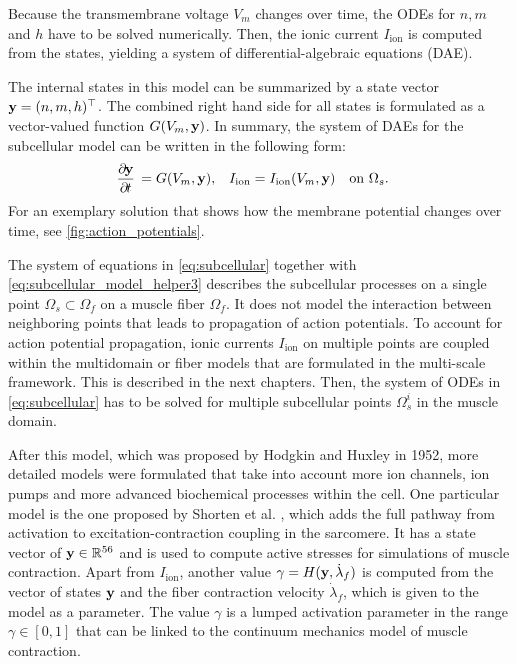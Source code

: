 Because the transmembrane voltage $V_m$ changes over time, the ODEs for $n, m$ and $h$ have to be solved numerically. Then, the ionic current $I_\text{ion}$ is computed from the states, yielding a system of differential-algebraic equations (DAE).

The internal states in this model can be summarized by a state vector $\textbf{y} = (n,m,h)^\top$. 
The combined right hand side for all states is formulated as a vector-valued function $G(V_m,\textbf{y})$.
In summary, the system of DAEs for the subcellular model can be written in the following form:
\begin{align}
  \dfrac{\partial\bfy}{\partial t} &= G(V_m,\bfy),& I_\text{ion}&=I_\text{ion}(V_m,\bfy) \quad \text{on }\Omega_s\label{eq:subcellular}.
\end{align}
For an exemplary solution that shows how the membrane potential changes over time, see \cref{fig:action_potentials}. 

The system of equations in \cref{eq:subcellular} together with \cref{eq:subcellular_model_helper3} describes the subcellular processes on a single point $\Omega_s \subset \Omega_f$ on a muscle fiber $\Omega_f$. 
It does not model the interaction between neighboring points that leads to propagation of action potentials.
To account for action potential propagation, ionic currents $I_\text{ion}$ on multiple points are coupled within the multidomain or fiber models that are formulated in the multi-scale framework. This is described in the next chapters.
Then, the system of ODEs in \cref{eq:subcellular} has to be solved for multiple subcellular points $\Omega_s^i$ in the muscle domain.

After this model, which was proposed by Hodgkin and Huxley in 1952, more detailed models were formulated that take into account more ion channels, ion pumps and more advanced biochemical processes within the cell. One particular model is the one proposed by Shorten et al. \cite{Shorten2007}, which adds the full pathway from activation to excitation-contraction coupling in the sarcomere. It has a state vector of $\textbf{y} \in \mathbb{R}^{56}$ and is used to compute active stresses for simulations of muscle contraction. Apart from $I_\text{ion}$, another value $\gamma = H(\textbf{y},\dot{\lambda}_f)$ is computed from the vector of states $\textbf{y}$ and the fiber contraction velocity $\dot{\lambda}_f$, which is given to the model as a parameter.
The value $\gamma$ is a lumped activation parameter in the range $\gamma \in [0,1]$ that can be linked to the continuum mechanics model of muscle contraction.


